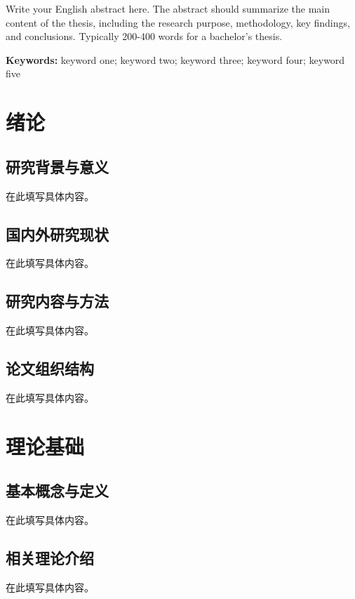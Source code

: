 \documentclass[a4paper,12pt,oneside]{ctexart}
\begin{document}
Write your English abstract here. The abstract should summarize the main content of the thesis, including the research purpose, methodology, key findings, and conclusions. Typically 200-400 words for a bachelor's thesis.

\vspace{1cm}
\noindent\textbf{Keywords:} keyword one; keyword two; keyword three; keyword four; keyword five

\newpage
\tableofcontents


\newpage


\section{绪论}
\subsection{研究背景与意义}
在此填写具体内容。

\subsection{国内外研究现状}
在此填写具体内容。

\subsection{研究内容与方法}
在此填写具体内容。

\subsection{论文组织结构}
在此填写具体内容。


\section{理论基础}
\subsection{基本概念与定义}
在此填写具体内容。

\subsection{相关理论介绍}
在此填写具体内容。
\end{document}
